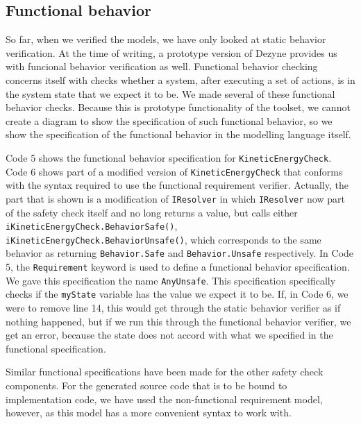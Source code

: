 \documentclass[12pt]{scrreprt}
\begin{document}
\subsection{Functional behavior}
So far, when we verified the models, we have only looked at static behavior verification. At the time of writing, a prototype version of Dezyne provides us with funcional behavior verification as well. Functional behavior checking concerns itself with checks whether a system, after executing a set of actions, is in the system state that we expect it to be. We made several of these functional behavior checks. Because this is prototype functionality of the toolset, we cannot create a diagram to show the specification of such functional behavior, so we show the specification of the functional behavior in the modelling language itself.
\par
Code 5 shows the functional behavior specification for \texttt{KineticEnergyCheck}. Code 6 shows part of a modified version of \texttt{KineticEnergyCheck} that conforms with the syntax required to use the functional requirement verifier. Actually, the part that is shown is a modification of \texttt{IResolver} in which \texttt{IResolver} now part of the safety check itself and no long returns a value, but calls either \texttt{iKineticEnergyCheck.BehaviorSafe()}, \texttt{iKineticEnergyCheck.BehaviorUnsafe()}, which corresponds to the same behavior as returning \texttt{Behavior.Safe} and \texttt{Behavior.Unsafe} respectively. In Code 5, the \texttt{Requirement} keyword is used to define a functional behavior specification. We gave this specification the name \texttt{AnyUnsafe}. This specification specifically checks if the \texttt{myState} variable has the value we expect it to be. If, in Code 6, we were to remove line 14, this would get through the static behavior verifier as if nothing happened, but if we run this through the functional behavior verifier, we get an error, because the state does not accord with what we specified in the functional specification.


Similar functional specifications have been made for the other safety check components. For the generated source code that is to be bound to implementation code, we have used the non-functional requirement model, however, as this model has a more convenient syntax to work with.
\end{document}
